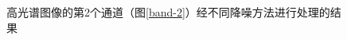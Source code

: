 \documentclass[12pt, a4paper]{article}
\begin{document}
\begin{figure}[htbp]
\caption{高光谱图像的第2个通道（图\ref{band-2}）经不同降噪方法进行处理的结果}
\label{bands-2}
\end{figure}
	
\end{document}
